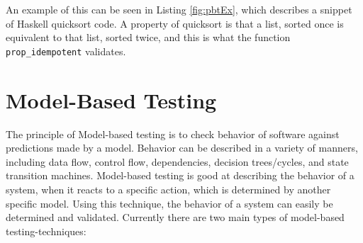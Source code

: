An example of this can be seen in Listing \ref{fig:pbtEx}, which describes a snippet of Haskell quicksort code. A property of quicksort is that a list, sorted once is equivalent to that list, sorted twice, and this is what the function \lstinline{prop_idempotent} validates.

\section{Model-Based Testing}

The principle of Model-based testing is to check behavior of software against predictions made by a model. Behavior can be described in a variety of manners, including data flow, control flow, dependencies, decision trees/cycles, and state transition machines. Model-based testing is good at describing the behavior of a system, when it reacts to a specific action, which is determined by another specific model. Using this technique, the behavior of a system can easily be determined and validated. Currently there are two main types of model-based testing-techniques:

